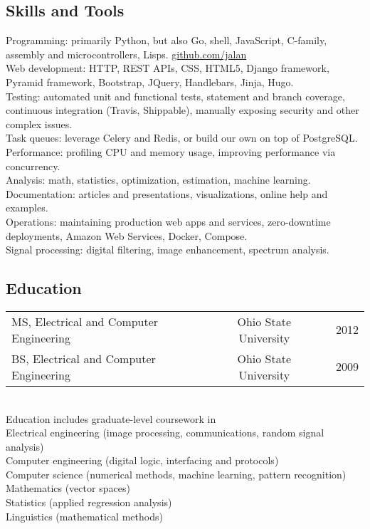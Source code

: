 \documentclass[12pt]{report}
\makeatletter
\renewcommand{\bullet}{$\vcenter{\hbox{~\huge$\cdot$~}}$}
\newenvironment{bullets}
{\tabularx{\textwidth}{ @{\bullet} X @{} }}
{\endtabularx}
\makeatother
\begin{document}
\subsection*{Skills and Tools}
\begin{bullets}
Programming: primarily Python, but also Go, shell, JavaScript, C-family, assembly and microcontrollers, Lisps. \href{https://github.com/jalan}{github.com/jalan} \\
Web development: HTTP, REST APIs, CSS, HTML5, Django framework, Pyramid framework, Bootstrap, JQuery, Handlebars, Jinja, Hugo. \\
Testing: automated unit and functional tests, statement and branch coverage, continuous integration (Travis, Shippable), manually exposing security and other complex issues. \\
Task queues: leverage Celery and Redis, or build our own on top of PostgreSQL. \\
Performance: profiling CPU and memory usage, improving performance via concurrency. \\
Analysis: math, statistics, optimization, estimation, machine learning. \\
Documentation: articles and presentations, visualizations, online help and examples. \\
Operations: maintaining production web apps and services, zero-downtime deployments, Amazon Web Services, Docker, Compose. \\
Signal processing: digital filtering, image enhancement, spectrum analysis. \\
\end{bullets}

\subsection*{Education}
\begin{tabularx}{\textwidth}{ @{\bullet} l X c X r @{} }
MS, Electrical and Computer Engineering && Ohio State University && 2012 \\
BS, Electrical and Computer Engineering && Ohio State University && 2009 \\
\end{tabularx}
\newline \\
Education includes graduate-level coursework in \\
\begin{bullets}
Electrical engineering (image processing, communications, random signal analysis) \\
Computer engineering (digital logic, interfacing and protocols) \\
Computer science (numerical methods, machine learning, pattern recognition) \\
Mathematics (vector spaces) \\
Statistics (applied regression analysis) \\
Linguistics (mathematical methods) \\
\end{bullets}
\end{document}
